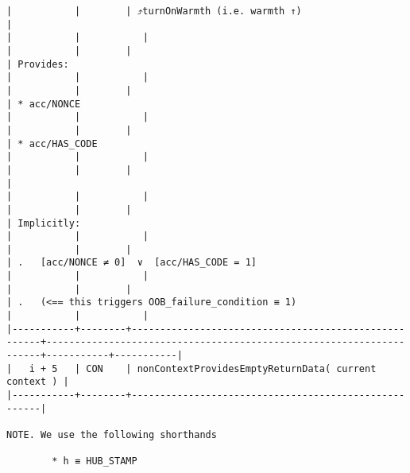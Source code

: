 \documentclass[varwidth=\maxdimen,margin=0.5cm,multi={verbatim}]{standalone}
\begin{document}
\begin{verbatim}
|           |        | ⤴️turnOnWarmth (i.e. warmth ↑)                        |                                                                     |           |           |
|           |        |                                                      | Provides:                                                           |           |           |
|           |        |                                                      | * acc/NONCE                                                         |           |           |
|           |        |                                                      | * acc/HAS_CODE                                                      |           |           |
|           |        |                                                      |                                                                     |           |           |
|           |        |                                                      | Implicitly:                                                         |           |           |
|           |        |                                                      | .   [acc/NONCE ≠ 0]  ∨  [acc/HAS_CODE = 1]                          |           |           |
|           |        |                                                      | .   (<== this triggers OOB_failure_condition ≡ 1)                   |           |           |
|-----------+--------+------------------------------------------------------+---------------------------------------------------------------------+-----------+-----------|
|   i + 5   | CON    | nonContextProvidesEmptyReturnData( current context ) |
|-----------+--------+------------------------------------------------------|

NOTE. We use the following shorthands

        * h ≡ HUB_STAMP

\end{verbatim}
\end{document}
